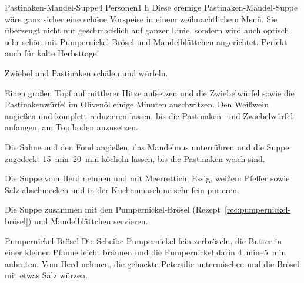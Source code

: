 \begin{recipe}{Pastinaken-Mandel-Suppe}{4 Personen}{1 h}
    \freeform Diese cremige Pastinaken-Mandel-Suppe wäre ganz sicher eine schöne Vorspeise in einem weihnachtlichem Menü. Sie überzeugt nicht nur geschmacklich auf ganzer Linie, sondern wird auch optisch sehr schön mit Pumpernickel-Brösel und Mandelblättchen angerichtet. Perfekt auch für kalte Herbsttage!

    Zwiebel und Pastinaken schälen und würfeln.

    Einen großen Topf auf mittlerer Hitze aufsetzen und die Zwiebelwürfel sowie die Pastinakenwürfel im Olivenöl einige Minuten anschwitzen. Den Weißwein angießen und komplett reduzieren lassen, bis die Pastinaken- und Zwiebelwürfel anfangen, am Topfboden anzusetzen.

    Die Sahne und den Fond angießen, das Mandelmus unterrühren und die Suppe zugedeckt \SIrange{15}{20}{\minute} köcheln lassen, bis die Pastinaken weich sind.

    Die Suppe vom Herd nehmen und mit Meerrettich, Essig, weißem Pfeffer sowie Salz abschmecken und in der Küchenmaschine sehr fein pürieren.

    Die Suppe zusammen mit den Pumpernickel-Brösel (Rezept~\ref{rec:pumpernickel-brösel}) und Mandelblättchen servieren.
    \freeform\hrulefill
\end{recipe}

\begin{recipe}{Pumpernickel-Brösel}{}{}
    Die Scheibe Pumpernickel fein zerbröseln, die Butter in einer kleinen Pfanne leicht bräunen und die Pumpernickel darin \SIrange{4}{5}{\minute} anbraten. Vom Herd nehmen, die gehackte Petersilie untermischen und die Brösel mit etwas Salz würzen.
    \freeform\hrulefill
\end{recipe}
